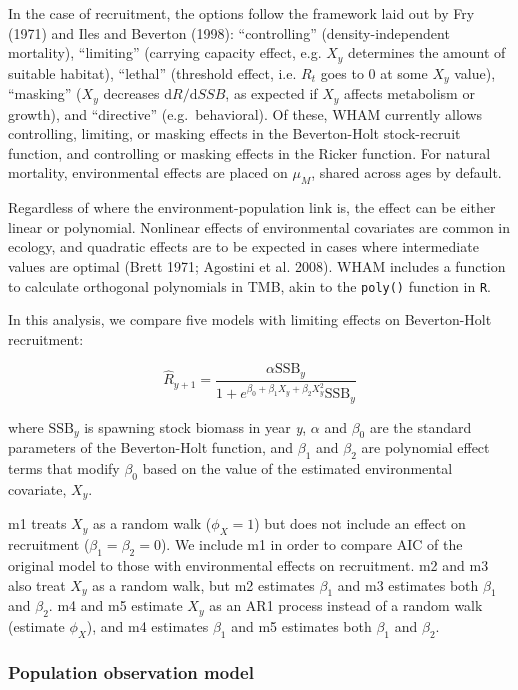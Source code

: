 \documentclass[]{article}
\begin{document}
In the case of recruitment, the options follow the framework laid out by
Fry (1971) and Iles and Beverton (1998): ``controlling''
(density-independent mortality), ``limiting'' (carrying capacity effect,
e.g. \(X_y\) determines the amount of suitable habitat), ``lethal''
(threshold effect, i.e. \(R_t\) goes to 0 at some \(X_y\) value),
``masking'' (\(X_y\) decreases \(\text{d}R/\text{d}SSB\), as expected if
\(X_y\) affects metabolism or growth), and ``directive''
(e.g.~behavioral). Of these, WHAM currently allows controlling,
limiting, or masking effects in the Beverton-Holt stock-recruit
function, and controlling or masking effects in the Ricker function. For
natural mortality, environmental effects are placed on \(\mu_M\), shared
across ages by default.

Regardless of where the environment-population link is, the effect can
be either linear or polynomial. Nonlinear effects of environmental
covariates are common in ecology, and quadratic effects are to be
expected in cases where intermediate values are optimal (Brett 1971;
Agostini et al. 2008). WHAM includes a function to calculate orthogonal
polynomials in TMB, akin to the \texttt{poly()} function in \texttt{R}.

In this analysis, we compare five models with limiting effects on
Beverton-Holt recruitment:

\[\hat{R}_{y+1} = \frac{\alpha \text{SSB}_{y}}{1 + e^{\beta_0 + \beta_1 X_{y} + \beta_2 X^2_{y}} \text{SSB}_y}\]

where \(\text{SSB}_y\) is spawning stock biomass in year \emph{y},
\(\alpha\) and \(\beta_0\) are the standard parameters of the
Beverton-Holt function, and \(\beta_1\) and \(\beta_2\) are polynomial
effect terms that modify \(\beta_0\) based on the value of the estimated
environmental covariate, \(X_y\).

m1 treats \(X_y\) as a random walk (\(\phi_X = 1\)) but does not include
an effect on recruitment (\(\beta_1 = \beta_2 = 0\)). We include m1 in
order to compare AIC of the original model to those with environmental
effects on recruitment. m2 and m3 also treat \(X_y\) as a random walk,
but m2 estimates \(\beta_1\) and m3 estimates both \(\beta_1\) and
\(\beta_2\). m4 and m5 estimate \(X_y\) as an AR1 process instead of a
random walk (estimate \(\phi_X\)), and m4 estimates \(\beta_1\) and m5
estimates both \(\beta_1\) and \(\beta_2\).

\hypertarget{population-observation-model}{%
\subsubsection{Population observation
model}\label{population-observation-model}}
\end{document}
